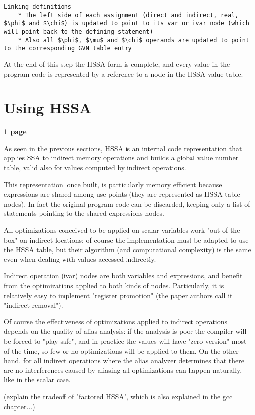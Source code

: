 \begin{verbatim}
Linking definitions
    * The left side of each assignment (direct and indirect, real, $\phi$ and $\chi$) is updated to point to its var or ivar node (which will point back to the defining statement)
    * Also all $\phi$, $\mu$ and $\chi$ operands are updated to point to the corresponding GVN table entry
\end{verbatim}

At the end of this step the HSSA form is complete, and every value in the program code is represented by a reference to a node in the HSSA value table.

\section{Using HSSA}
\textbf{1 page}

As seen in the previous sections, HSSA is an internal code representation that applies SSA to indirect memory operations and builds a global value number table, valid also for values computed by indirect operations.


This representation, once built, is particularly memory efficient because expressions are shared among use points (they are represented as HSSA table nodes). In fact the original program code can be discarded, keeping only a list of statements pointing to the shared expressions nodes.

All optimizations conceived to be applied on scalar variables work "out of the box" on indirect locations: of course the implementation must be adapted to use the HSSA table, but their algorithm (and computational complexity) is the same even when dealing with values accessed indirectly.

Indirect operation (ivar) nodes are both variables and expressions, and benefit from the optimizations applied to both kinds of nodes. Particularly, it is relatively easy to implement "register promotion" (the paper authors call it "indirect removal").

Of course the effectiveness of optimizations applied to indirect operations depends on the quality of alias analysis: if the analysis is poor the compiler will be forced to "play safe", and in practice the values will have "zero version" most of the time, so few or no optimizations will be applied to them.
On the other hand, for all indirect operations where the alias analyzer determines that there are no interferences caused by aliasing all optimizations can happen naturally, like in the scalar case.

(explain the tradeoff of "factored HSSA", which is also explained in the gcc chapter...)



